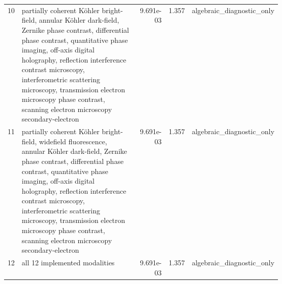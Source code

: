 \begin{tabular}{r p{0.43\linewidth} r r p{0.20\linewidth}}
10 & partially coherent Köhler bright-field, annular Köhler dark-field, Zernike phase contrast, differential phase contrast, quantitative phase imaging, off-axis digital holography, reflection interference contrast microscopy, interferometric scattering microscopy, transmission electron microscopy phase contrast, scanning electron microscopy secondary-electron & 9.691e-03 & 1.357 & algebraic\_diagnostic\_only \\
11 & partially coherent Köhler bright-field, widefield fluorescence, annular Köhler dark-field, Zernike phase contrast, differential phase contrast, quantitative phase imaging, off-axis digital holography, reflection interference contrast microscopy, interferometric scattering microscopy, transmission electron microscopy phase contrast, scanning electron microscopy secondary-electron & 9.691e-03 & 1.357 & algebraic\_diagnostic\_only \\
12 & all 12 implemented modalities & 9.691e-03 & 1.357 & algebraic\_diagnostic\_only \\
\bottomrule
\end{tabular}
